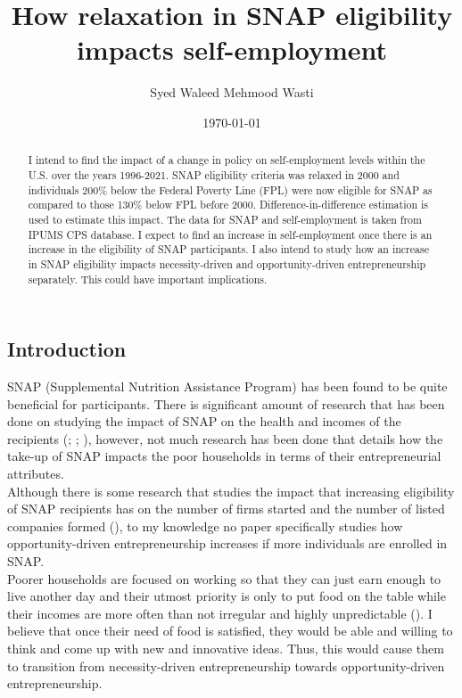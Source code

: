 \documentclass[12pt]{article}
\title{\textbf{How relaxation in SNAP eligibility impacts self-employment}}
\author{Syed Waleed Mehmood Wasti}
\date{\today}
\begin{document}
\begin{titlingpage}
\maketitle
\begin{abstract}
\noindent 
I intend to find the impact of a change in policy on self-employment levels within the U.S. over the years 1996-2021. SNAP eligibility criteria was relaxed in 2000 and individuals 200\% below the Federal Poverty Line (FPL) were now eligible for SNAP as compared to those 130\% below FPL before 2000.  Difference-in-difference estimation is used to estimate this impact. The data for SNAP and self-employment is taken from IPUMS CPS database. I expect to find an increase in self-employment once there is an increase in the eligibility of SNAP participants. I also intend to study how an increase in SNAP eligibility impacts necessity-driven and opportunity-driven entrepreneurship separately. This could have important implications. 
 
\end{abstract}

\newpage
\tableofcontents


\newpage


\section*{Introduction}

SNAP (Supplemental Nutrition Assistance Program) has been found to be quite beneficial for participants. There is significant amount of research that has been done on studying the impact of SNAP on the health and incomes of the recipients (\cite{tiehen2012alleviating}; \cite{hoynes2017real}; \cite{bartfeld2015snap}), however, not much research has been done that details how the take-up of SNAP impacts the poor households in terms of their entrepreneurial attributes.\\ 

Although there is some research that studies the impact that increasing eligibility of SNAP recipients has on the number of firms started and the number of listed companies formed (\cite{olds2016food}), to my knowledge no paper specifically studies how opportunity-driven entrepreneurship increases if more individuals are enrolled in SNAP. \\

Poorer households are focused on working so that they can just earn enough to live another day and their utmost priority is only to put food on the table while their incomes are more often than not irregular and highly unpredictable (\cite{collins2009portfolios}). I believe that once their need of food is satisfied, they would be able and willing to think and come up with new and innovative ideas. Thus, this would cause them to transition from necessity-driven entrepreneurship towards opportunity-driven entrepreneurship. \\


\end{titlingpage}
\end{document}
